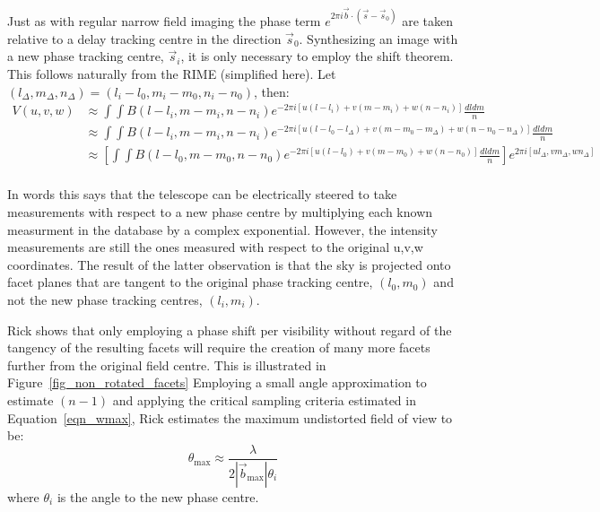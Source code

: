 Just as with regular narrow field imaging the phase term $e^{2\pi i \vec{b}\cdot(\vec{s}-\vec{s}_0)}$ are taken relative to a delay tracking centre in the direction
$\vec{s}_0$. Synthesizing an image with a new phase tracking centre, $\vec{s}_i$, it is only necessary to employ the shift theorem. This follows naturally from the
RIME (simplified here). Let $(l_\Delta,m_\Delta,n_\Delta) = (l_i-l_0,m_i-m_0,n_i-n_0)$, then:
\begin{equation}
  \label{eqn_faceting}
  \begin{split}
    V(u,v,w)&\approx\int{\int{B(l-l_i,m-m_i,n-n_i)e^{-2{\pi}i[u(l-l_i)+v(m-m_i)+w(n-n_i)]}\frac{dldm}{n}}}\\
    &\approx\int{\int{B(l-l_i,m-m_i,n-n_i)e^{-2{\pi}i[u(l-l_0-l_\Delta)+v(m-m_0-m_\Delta)+w(n-n_0-n_\Delta)]}\frac{dldm}{n}}}\\
    &\approx\left[\int{\int{B(l-l_0,m-m_0,n-n_0)e^{-2{\pi}i[u(l-l_0)+v(m-m_0)+w(n-n_0)]}\frac{dldm}{n}}}\right]e^{2{\pi}i[ul_\Delta,vm_\Delta,wn_\Delta]}\\
  \end{split}
\end{equation}

In words this says that the telescope can be electrically steered to take measurements with respect to a new phase centre by multiplying each known measurment in
the database by a complex exponential. However, the intensity measurements are still the ones measured with respect to the original u,v,w coordinates. The result of
the latter observation is that the sky is projected onto facet planes that are tangent to the original phase tracking centre, $(l_0,m_0)$ and not the new phase 
tracking centres, $(l_i,m_i)$.

Rick shows that only employing a phase shift per visibility without regard of the tangency of the resulting facets will require the creation of many more facets 
further from the original field centre. This is illustrated in Figure~\ref{fig_non_rotated_facets} Employing a small angle approximation to estimate $(n-1)$ and applying the critical sampling criteria estimated in 
Equation~\ref{eqn_wmax}, Rick estimates the maximum undistorted field of view to be:
\begin{equation}
 \theta_{\text{max}} \approx \frac{\lambda}{2|\vec{b}_{\text{max}}|\theta_i}
\end{equation}
where $\theta_i$ is the angle to the new phase centre.

